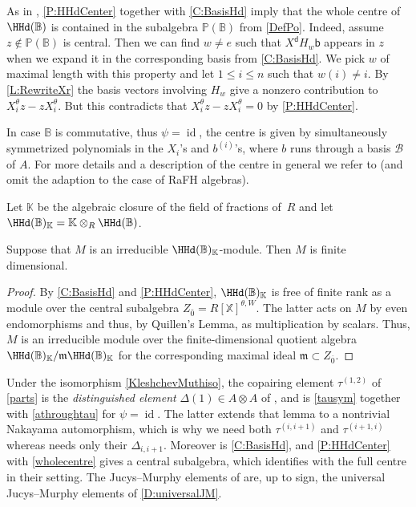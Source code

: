 \documentclass[a4paper,11pt]{amsart}
\let\ov\overline
\newcommand\cB{\mathcal{B}}
\numberwithin{equation}{subsection}
\theoremstyle{definition}
\theoremstyle{theorem}
\theoremstyle{remark}
\newcommand\Sym{W}
\newcommand\bd{\mathsf{d}}
\newcommand\bb{\mathsf{b}}
\newcommand\op{\operatorname}
\newcommand\taui[1][i]{\tau^{(#1)}}
\newcommand\Po{\mathbb{P}(\mathbb{B})}
\newcommand\X{\mathbb{X}}
\newcommand\RR{R}
\newcommand\K{\mathbb{K}}
\newcommand\RX{{\RR[\X]}}
\newcommand{\Bo}{\mathbb{B}}
\begin{document}
\begin{Remark}\label{wholecentre}  As in \cite[Lemma~4.12]{Savage:AffineWreath},  \autoref{P:HHdCenter} together with \autoref{C:BasisHd} imply that the whole centre of $\HHd(\Bo)$ is contained in the subalgebra $\Po$ from \autoref{DefPo}.  Indeed,  assume $z\not\in\Po$ is central. Then we can find $w\not=e$ such that $X^{\bd}H_w\bb$ appears in $z$ when we expand it in the corresponding basis from  \autoref{C:BasisHd}. We pick $w$ of maximal length with this property and let $1\leq i\leq n$ such that $w(i)\not=i$. By   \autoref{L:RewriteXr}  the basis vectors involving $H_w$ give a nonzero contribution to  $X_i^\theta z - z X_i^\theta$. But this contradicts that $X_i^\theta z - z X_i^\theta=0$ by \autoref{P:HHdCenter}.

In case $\Bo$ is commutative, thus $\psi=\op{id}$, the centre is given by simultaneously symmetrized polynomials in the $X_i$'s and $b^{(i)}$'s, where $b$ runs through a basis $\cB$ of $A$. For more details and a  description of the centre in general we refer to   \cite[Theorem~4.14]{Savage:AffineWreath} (and omit the adaption to the case of RaFH  algebras).
\end{Remark}

  Let $\K$ be the algebraic closure of the field of fractions of~$\RR$ and let
  $\HHd(\Bo)_\K=\K\otimes_\RR \HHd(\Bo)$.

  \begin{Proposition}\label{fdauto}
     Suppose that $M$ is an irreducible $\HHd(\Bo)_\K$-module. Then  $M$
     is finite dimensional.
  \end{Proposition}

  \begin{proof}
    By \autoref{C:BasisHd} and \autoref{P:HHdCenter},
    $\HHd(\Bo)_\K$ is free of finite rank as a module over the central subalgebra $Z_{\bar{0}}=\RX^{\theta,\Sym}$. The latter acts on $M$ by even endomorphisms and thus, by Quillen's Lemma, as multiplication by scalars. Thus, $M$ is an irreducible module over the finite-dimensional quotient algebra $\HHd(\Bo)_\K /\mathfrak m\HHd(\Bo)_\K$ for the corresponding maximal ideal $\mathfrak m\subset Z_{\ov 0}$.
  \end{proof}
\begin{Remark}\label{R:KMdictionary}
  Under the isomorphism  \autoref{KleshchevMuthiso}, the copairing element $\taui[1,2]$ of
  \autoref{parts} is the \emph{distinguished element} $\Delta(1)\in A\otimes A$
  of \cite[\S3.1]{KleshchevMuth}, and \cite[Lemma~3.1]{KleshchevMuth} is
  \autoref{tausym} together with \autoref{athroughtau} for $\psi=\op{id}$. The
  latter extends that lemma to a nontrivial Nakayama automorphism, which is why
  we need both $\taui[i,i+1]$ and $\taui[i+1,i]$ whereas \cite{KleshchevMuth}
  needs only their $\Delta_{i,i+1}$. Moreover
  \cite[Theorem~3.8]{KleshchevMuth} is \autoref{C:BasisHd}, and \autoref{P:HHdCenter} with \autoref{wholecentre} gives a central subalgebra, which \cite[Proposition~3.12]{KleshchevMuth} identifies with the full centre in their setting. The Jucys--Murphy elements of
  \cite[\S3.6]{KleshchevMuth} are, up to sign, the universal Jucys--Murphy
  elements of \autoref{D:universalJM}.
\end{Remark}
\end{document}
